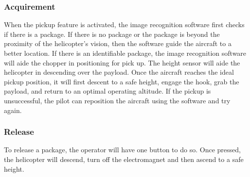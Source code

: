 \documentclass[onecolumn, oneside, letterpaper, draftclsnofoot, 10pt, compsoc]{IEEEtran}
\begin{document}
\subsubsection{Acquirement}
When the pickup feature is activated, the image recognition software first checks if there is a package. If there is no package or the package is beyond the proximity of the helicopter's vision, then the software guide the aircraft to a better location. If there is an identifiable package, the image recognition software will aide the chopper in positioning for pick up. The height sensor will aide the helicopter in descending over the payload. Once the aircraft reaches the ideal pickup position, it will first descent to a safe height,  engage the hook, grab the payload, and return to an optimal operating altitude. If the pickup is unsuccessful, the pilot can reposition the aircraft using the software and try again.

\subsubsection{Release}
To release a package, the operator will have one button to do so. Once pressed, the helicopter will descend, turn off the electromagnet and then ascend to a safe height.
\end{document}
